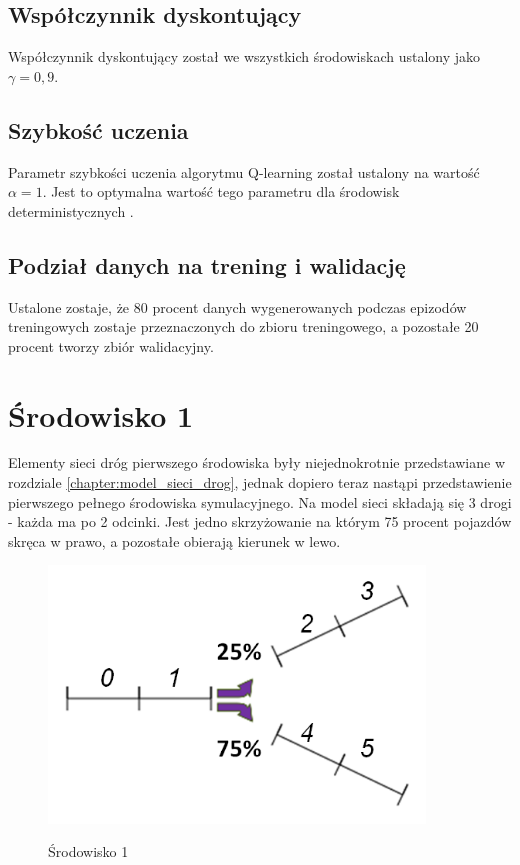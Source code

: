 \documentclass[12pt]{book}
\theoremstyle{plain}
\begin{document}
\subsection*{Współczynnik dyskontujący}
Współczynnik dyskontujący został we wszystkich środowiskach ustalony jako $\gamma=0,9$.
\subsection*{Szybkość uczenia}
Parametr szybkości uczenia algorytmu Q-learning został ustalony na wartość $\alpha=1$. Jest to optymalna wartość tego parametru dla środowisk deterministycznych \cite{reinforcementBook}.
\subsection*{Podział danych na trening i walidację}
Ustalone zostaje, że 80 procent danych wygenerowanych podczas epizodów treningowych zostaje przeznaczonych do zbioru treningowego, a pozostałe 20 procent tworzy zbiór walidacyjny. 
\section{Środowisko 1}
Elementy sieci dróg pierwszego środowiska były niejednokrotnie przedstawiane w rozdziale \ref{chapter:model_sieci_drog}, jednak dopiero teraz nastąpi przedstawienie pierwszego pełnego środowiska symulacyjnego. Na model sieci składają się 3 drogi - każda ma po 2 odcinki. Jest jedno skrzyżowanie na którym 75 procent pojazdów skręca w prawo, a pozostałe obierają kierunek w lewo.
\begin{figure}[H]
	\centering
	\includegraphics[width=10cm]{images/env_11_perc_italic}
	\label{fig:env_11}
	\caption{Środowisko 1}
\end{figure}
\end{document}
